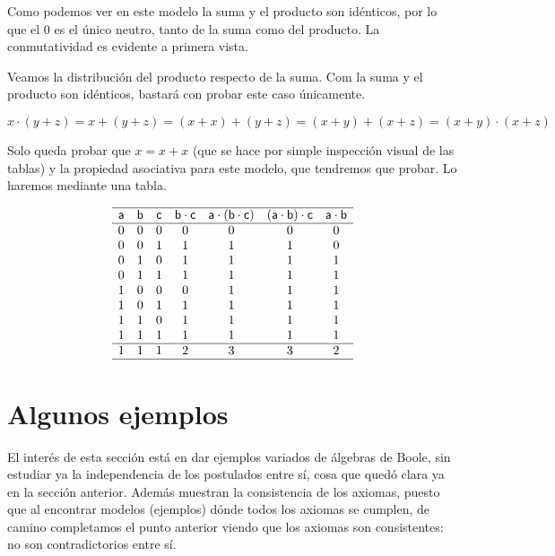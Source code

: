 \documentclass[final,12pt,a4paper,twoside,fleqn]{extbook}
\theoremstyle{definition}
\theoremstyle{remark}
\begin{document}
	Como podemos ver en este modelo la suma y el producto son idénticos, por
lo que el \(0\) es el único neutro, tanto de la suma como del producto. La
conmutatividad es evidente a primera vista. 


	Veamos la distribución del producto respecto de la suma. Com la suma y el
producto son idénticos, bastará con probar este caso únicamente.



\begin{equation}
x \cdot (y + z) = x + ( y + z ) = ( x + x ) + ( y + z ) = ( x + y ) + ( x + z
) = ( x + y ) \cdot ( x + z )
\end{equation}



	Solo queda probar que \(x = x + x\) (que se hace por simple inspección
visual de las tablas) y la propiedad asociativa para este modelo, que
tendremos que probar. Lo haremos mediante una tabla.



\begin{equation}
  \begin{matrix}
  \hline
  \mathsf{a} & \mathsf{b} & \mathsf{c} & \mathsf{b}\cdot\mathsf{c} &
  \mathsf{a}\cdot\left( \mathsf{b} \cdot \mathsf{c} \right) &
  \left(\mathsf{a}\cdot \mathsf{b}\right) \cdot \mathsf{c} &
  \mathsf{a}\cdot\mathsf{b}\\
  \hline
  0 & 0 & 0 & 0 & 0    & 0 & 0 \\
  0 & 0 & 1 & 1 & 1    & 1 & 0 \\
  0 & 1 & 0 & 1 & 1    & 1 & 1 \\
  0 & 1 & 1 & 1 & 1    & 1 & 1 \\
  1 & 0 & 0 & 0 & 1    & 1 & 1 \\
  1 & 0 & 1 & 1 & 1    & 1 & 1 \\
  1 & 1 & 0 & 1 & 1    & 1 & 1 \\
  1 & 1 & 1 & 1 & 1    & 1 & 1 \\
  \hline
  1 & 1 & 1 & 2 & 3    & 3 & 2 \\
  \hline
  \end{matrix}
\end{equation}


\section{Algunos ejemplos}



	El interés de esta sección está en dar ejemplos variados de álgebras de
Boole, sin estudiar ya la independencia de los postulados entre sí, cosa que
quedó clara ya en la sección anterior. Además muestran la consistencia de los
axiomas, puesto que al encontrar modelos (ejemplos) dónde todos los axiomas
se cumplen, de camino completamos el punto anterior viendo que los axiomas
son consistentes: no son contradictorios entre sí.
\end{document}

